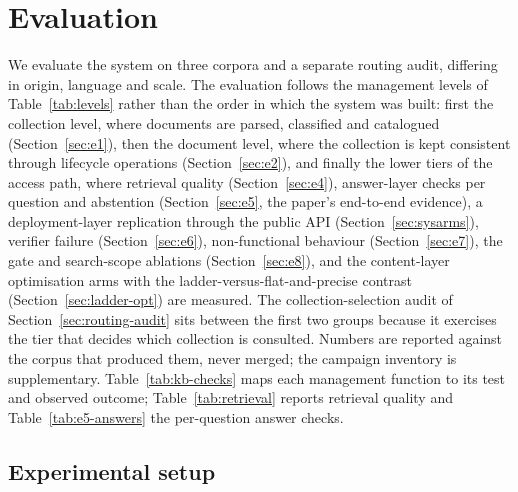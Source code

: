 \section{Evaluation}
\label{sec:eval}

We evaluate the system on three corpora and a separate routing audit, differing in origin, language
and scale. The evaluation follows the management levels of
Table~\ref{tab:levels} rather than the order in which the system was built:
first the collection level, where documents are parsed, classified and
catalogued (Section~\ref{sec:e1}), then the document level, where the
collection is kept consistent through lifecycle operations
(Section~\ref{sec:e2}), and finally the lower tiers of the access path, where
retrieval quality (Section~\ref{sec:e4}), answer-layer checks per question and
abstention (Section~\ref{sec:e5}, the paper's end-to-end evidence), a
deployment-layer replication through the public API (Section~\ref{sec:sysarms}),
verifier failure (Section~\ref{sec:e6}), non-functional behaviour
(Section~\ref{sec:e7}), the gate and search-scope ablations
(Section~\ref{sec:e8}), and the content-layer optimisation arms with the
ladder-versus-flat-and-precise contrast (Section~\ref{sec:ladder-opt}) are
measured. The collection-selection audit of
Section~\ref{sec:routing-audit} sits between the first two groups because it
exercises the tier that decides which collection is consulted. Numbers are
reported against the corpus that produced them, never merged; the campaign
inventory is supplementary. Table~\ref{tab:kb-checks} maps each management
function to its test and observed outcome; Table~\ref{tab:retrieval} reports
retrieval quality and Table~\ref{tab:e5-answers} the per-question answer
checks.

\subsection{Experimental setup}
\label{sec:eval-setup}

